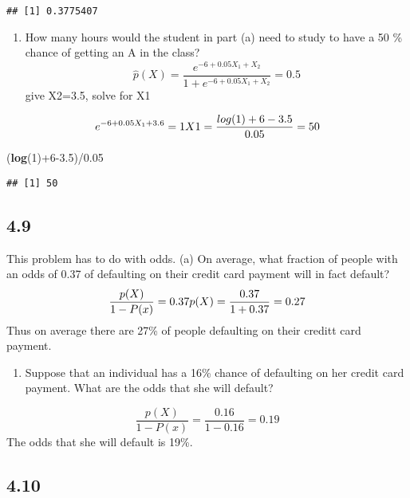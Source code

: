 \documentclass[]{article}
\newenvironment{Shaded}{\begin{snugshade}}{\end{snugshade}}
\newcommand{\KeywordTok}[1]{\textcolor[rgb]{0.13,0.29,0.53}{\textbf{{#1}}}}
\newcommand{\DecValTok}[1]{\textcolor[rgb]{0.00,0.00,0.81}{{#1}}}
\newcommand{\FloatTok}[1]{\textcolor[rgb]{0.00,0.00,0.81}{{#1}}}
\newcommand{\NormalTok}[1]{{#1}}
\providecommand{\tightlist}{%
  \setlength{\itemsep}{0pt}\setlength{\parskip}{0pt}}
\begin{document}
\begin{verbatim}
## [1] 0.3775407
\end{verbatim}

\begin{enumerate}
\def\labelenumi{(\alph{enumi})}
\setcounter{enumi}{1}
\tightlist
\item
  How many hours would the student in part (a) need to study to have a
  50 \% chance of getting an A in the class?
  \[\hat p(X) = \frac{e^{-6+0.05X_1+X_2}}{1+e^{-6+0.05X_1+X_2}}=0.5\]
  give X2=3.5, solve for X1
\end{enumerate}

\[e^{-6+0.05X_1+3.6}=1\\
X1 = \frac{log(1)+6-3.5}{0.05}=50\]

\begin{Shaded}
\begin{Highlighting}[]
\NormalTok{(}\KeywordTok{log}\NormalTok{(}\DecValTok{1}\NormalTok{)+}\DecValTok{6}\FloatTok{-3.5}\NormalTok{)/}\FloatTok{0.05}
\end{Highlighting}
\end{Shaded}

\begin{verbatim}
## [1] 50
\end{verbatim}

\subsection{4.9}\label{section-1}

This problem has to do with odds. (a) On average, what fraction of
people with an odds of 0.37 of defaulting on their credit card payment
will in fact default? \[\frac{p(X)}{1-P(x)}=0.37 \\
p(X) = \frac{0.37}{1+0.37}=0.27\] Thus on average there are 27\% of
people defaulting on their creditt card payment.

\begin{enumerate}
\def\labelenumi{(\alph{enumi})}
\setcounter{enumi}{1}
\tightlist
\item
  Suppose that an individual has a 16\% chance of defaulting on her
  credit card payment. What are the odds that she will default?
\end{enumerate}

\[\frac{p(X)}{1-P(x)}=\frac{0.16}{1-0.16}=0.19\] The odds that she will
default is 19\%.

\subsection{4.10}\label{section-2}
\end{document}
